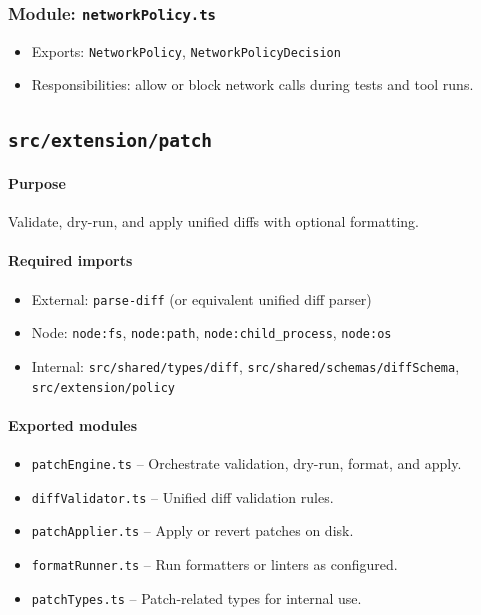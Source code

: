 \documentclass[11pt]{article}
\begin{document}
\subsubsection*{Module: \texttt{networkPolicy.ts}}
\begin{itemize}[noitemsep]
  \item Exports: \texttt{NetworkPolicy}, \texttt{NetworkPolicyDecision}
  \item Responsibilities: allow or block network calls during tests and tool runs.
\end{itemize}

\subsection{\texttt{src/extension/patch}}
\paragraph{Purpose} Validate, dry-run, and apply unified diffs with optional formatting.

\paragraph{Required imports}
\begin{itemize}[noitemsep]
  \item External: \texttt{parse-diff} (or equivalent unified diff parser)
  \item Node: \texttt{node:fs}, \texttt{node:path}, \texttt{node:child\_process}, \texttt{node:os}
  \item Internal: \texttt{src/shared/types/diff}, \texttt{src/shared/schemas/diffSchema},
        \texttt{src/extension/policy}
\end{itemize}

\paragraph{Exported modules}
\begin{itemize}[noitemsep]
  \item \texttt{patchEngine.ts} -- Orchestrate validation, dry-run, format, and apply.
  \item \texttt{diffValidator.ts} -- Unified diff validation rules.
  \item \texttt{patchApplier.ts} -- Apply or revert patches on disk.
  \item \texttt{formatRunner.ts} -- Run formatters or linters as configured.
  \item \texttt{patchTypes.ts} -- Patch-related types for internal use.
\end{itemize}
\end{document}
